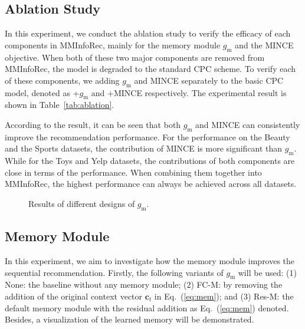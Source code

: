 \documentclass[conference]{IEEEtran}
\begin{document}
\subsection{Ablation Study}
\label{sec:ablation}
In this experiment, we conduct the ablation study to verify the efficacy of each components in MMInfoRec, mainly for the memory module $g_\text{m}$ and the MINCE objective. When both of these two major components are removed from MMInfoRec, the model is degraded to the standard CPC scheme. To verify each of these components, we adding $g_\text{m}$ and MINCE separately to the basic CPC model, denoted as +$g_\text{m}$ and +MINCE respectively. The experimental result is shown in Table~\ref{tab:ablation}.

According to the result, it can be seen that both $g_\text{m}$ and MINCE can consistently improve the recommendation performance. For the performance on the Beauty and the Sports datasets, the contribution of MINCE is more significant than $g_\text{m}$. While for the Toys and Yelp datasets, the contributions of both components are close in terms of the performance. When combining them together into MMInfoRec, the highest performance can always be achieved across all datasets.

\begin{figure}[t]
    \centering
    \caption{Results of different designs of $g_\text{m}$.}
    \label{fig:mem-design}
\end{figure}

\subsection{Memory Module}
\label{sec:mem-exp}
In this experiment, we aim to investigate how the memory module improves the sequential recommendation. Firstly, the following variants of $g_\text{m}$ will be used: (1) None: the baseline without any memory module; (2) FC-M: by removing the addition of the original context vector $\mathbf{c}_t$ in Eq.~(\ref{eq:mem}); and (3) Res-M: the default memory module with the residual addition as Eq.~(\ref{eq:mem}) denoted. Besides, a visualization of the learned memory will be demonstrated.
\end{document}
